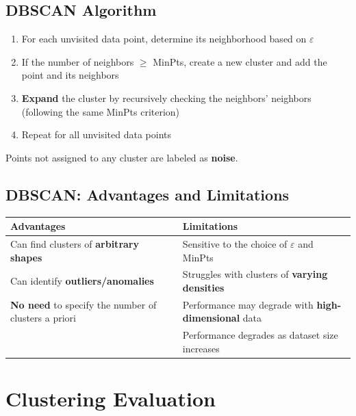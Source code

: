 \documentclass[11pt,a4paper]{article}
\theoremstyle{definition}
\theoremstyle{plain}
\theoremstyle{remark}
\begin{document}
\subsection{DBSCAN Algorithm}

\begin{tcolorbox}[colback=purple!5!white,colframe=purple!75!black,title=\textbf{DBSCAN Algorithm}]
\begin{enumerate}
    \item For each unvisited data point, determine its neighborhood based on $\varepsilon$
    \item If the number of neighbors $\geq$ MinPts, create a new cluster and add the point and its neighbors
    \item \textbf{Expand} the cluster by recursively checking the neighbors' neighbors (following the same MinPts criterion)
    \item Repeat for all unvisited data points
\end{enumerate}
Points not assigned to any cluster are labeled as \textbf{noise}.
\end{tcolorbox}

\subsection{DBSCAN: Advantages and Limitations}

\begin{center}
\begin{tabular}{|p{7cm}|p{7cm}|}
\hline
\textbf{Advantages} & \textbf{Limitations} \\
\hline
Can find clusters of \textbf{arbitrary shapes} & Sensitive to the choice of $\varepsilon$ and MinPts \\
\hline
Can identify \textbf{outliers/anomalies} & Struggles with clusters of \textbf{varying densities} \\
\hline
\textbf{No need} to specify the number of clusters a priori & Performance may degrade with \textbf{high-dimensional} data \\
\hline
& Performance degrades as dataset size increases \\
\hline
\end{tabular}
\end{center}


\section{Clustering Evaluation}
\end{document}
